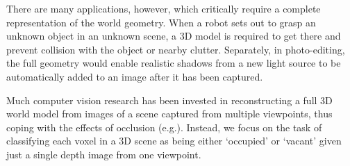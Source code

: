 \documentclass[10pt,twocolumn,letterpaper]{article}
\makeatletter
\renewcommand*{\eg}{e.g.\@\xspace}
\makeatother
\begin{document}
There are many applications, however, which critically require a complete representation of the world geometry.
When a robot sets out to grasp an unknown object in an unknown scene, a 3D model is required to get there and prevent collision with the object or nearby clutter.
Separately, in photo-editing, the full geometry would enable realistic shadows from a new light source to be automatically added to an image after it has been captured.

Much computer vision research has been invested in reconstructing a full 3D world model from images of a scene captured from multiple viewpoints, thus coping with the effects of occlusion  (\eg \cite{izadi-uist-2011}).
Instead, we focus on the task of classifying each voxel in a 3D scene as being either `occupied' or `vacant' given just a single depth image from one viewpoint.
\end{document}
